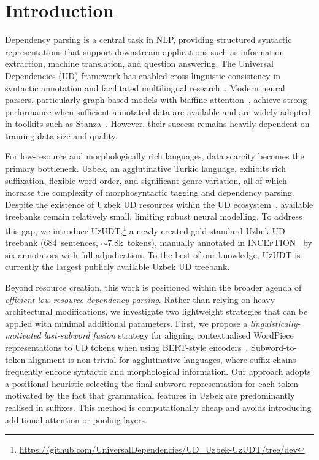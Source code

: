 \documentclass[runningheads]{llncs}
\begin{document}
\section{Introduction}
\label{sec:introduction}
Dependency parsing is a central task in NLP, providing structured syntactic representations that support downstream applications such as information extraction, machine translation, and question answering.
The Universal Dependencies (UD) framework has enabled cross-linguistic
consistency in syntactic annotation and facilitated multilingual
research~\cite{nivre-etal-2016-universal}.
Modern neural parsers, particularly graph-based models with biaffine
attention~\cite{DBLP:conf/iclr/DozatM17}, achieve strong performance
when sufficient annotated data are available and are widely adopted in
toolkits such as Stanza~\cite{qi-etal-2020-stanza}.
However, their success remains heavily dependent on training data size
and quality.

For low-resource and morphologically rich languages, data scarcity
becomes the primary bottleneck.
Uzbek, an agglutinative Turkic language, exhibits rich suffixation,
flexible word order, and significant genre variation, all of which
increase the complexity of morphosyntactic tagging and dependency
parsing.
Despite the existence of Uzbek UD resources within the UD
ecosystem~\cite{de-marneffe-etal-2021-universal}, available treebanks
remain relatively small, limiting robust neural modelling.
To address this gap, we introduce
\textsc{UzUDT},\footnote{\url{https://github.com/UniversalDependencies/UD_Uzbek-UzUDT/tree/dev}}
a newly created gold-standard Uzbek UD treebank (684~sentences,
${\sim}$7.8k~tokens), manually annotated in
\textsc{INCEpTION}~\cite{klie-etal-2018-inception} by six annotators
with full adjudication.
To the best of our knowledge, \textsc{UzUDT} is currently the largest
publicly available Uzbek UD treebank.

Beyond resource creation, this work is positioned within the broader
agenda of \emph{efficient low-resource dependency parsing}.
Rather than relying on heavy architectural modifications, we
investigate two lightweight strategies that can be applied with
minimal additional parameters.
First, we propose a \emph{linguistically-motivated last-subword
fusion} strategy for aligning contextualised WordPiece
representations to UD tokens when using BERT-style
encoders~\cite{devlin-etal-2019-bert}.
Subword-to-token alignment is non-trivial for agglutinative
languages, where suffix chains frequently encode syntactic and
morphological information.
Our approach adopts a positional heuristic selecting the final
subword representation for each token motivated by the fact that
grammatical features in Uzbek are predominantly realised in suffixes.
This method is computationally cheap and avoids introducing additional
attention or pooling layers.
\end{document}

